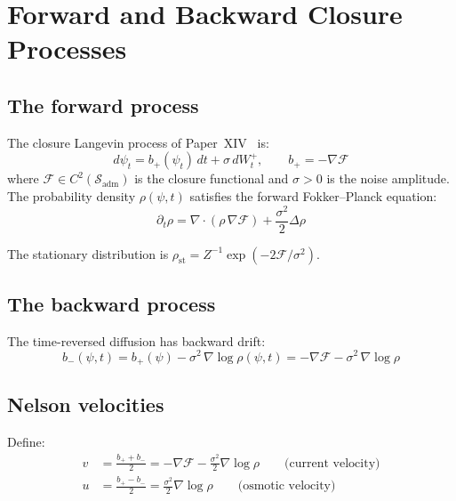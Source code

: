 \documentclass[12pt]{article}
\newcommand{\Fcal}{\mathcal{F}}
\newcommand{\Sadm}{\mathcal{S}_{\mathrm{adm}}}
\begin{document}
\section{Forward and Backward Closure Processes}\label{sec:processes}

\subsection{The forward process}

The closure Langevin process of Paper~XIV~\citep{SmartXIV} is:
\begin{equation}\label{eq:forward}
    d\psi_t = b_+(\psi_t)\, dt + \sigma\, dW_t^+, \qquad b_+ = -\nabla\Fcal
\end{equation}
where $\Fcal \in C^2(\Sadm)$ is the closure functional and $\sigma > 0$ is the noise amplitude. The probability density $\rho(\psi, t)$ satisfies the forward Fokker--Planck equation:
\begin{equation}\label{eq:FP}
    \partial_t \rho = \nabla\cdot(\rho\,\nabla\Fcal) + \frac{\sigma^2}{2}\Delta\rho
\end{equation}

The stationary distribution is $\rho_{\mathrm{st}} = Z^{-1}\exp(-2\Fcal/\sigma^2)$.

\subsection{The backward process}

The time-reversed diffusion has backward drift:
\begin{equation}\label{eq:backward_drift}
    b_-(\psi, t) = b_+(\psi) - \sigma^2\,\nabla\log\rho(\psi,t) = -\nabla\Fcal - \sigma^2\,\nabla\log\rho
\end{equation}

\subsection{Nelson velocities}

Define:
\begin{align}
    v &= \frac{b_+ + b_-}{2} = -\nabla\Fcal - \frac{\sigma^2}{2}\nabla\log\rho \qquad \text{(current velocity)} \label{eq:v} \\
    u &= \frac{b_+ - b_-}{2} = \frac{\sigma^2}{2}\nabla\log\rho \qquad \text{(osmotic velocity)} \label{eq:u}
\end{align}
\end{document}
